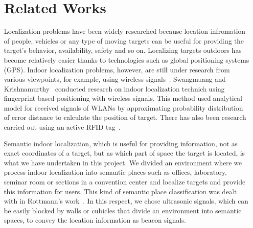 \section{Related Works}
\label{sec:related-works}


Localization problems have been widely researched because location infromation of people, vehicles or any type of moving targets can be useful for providing the target's behavior, availability, safety and so on. Localizing targets outdoors has become relatively easier thanks to technologies such as global positioning systems (GPS). Indoor localization problems, however, are still under research from various viewpoints, for example, using wireless signals~\cite{liu2007}. Swangmuang and Krishnamurthy~\cite{Swangmuang2008} conducted research on indoor localization technich using fingerprint based positioning with wireless signals. This method used analytical model for received signals of WLANs by approximating probability distribution of error distance to calculate the position of target. There has also been research carried out using an active RFID tag~\cite{Jin2006}.

Semantic indoor localization, which is useful for providing information, not as exact coordinates of a target, but as which part of space the target is located, is what we have undertaken in this project. We divided an environment where we process indoor localization into semantic places such as offices, laboratory, seminar room or sections in a convention center and localize targets and provide this information for users. This kind of semantic place classification was dealt with in Rottmann's work~\cite{Rottmann2005}. In this respect, we chose ultrasonic signals, which can be easily blocked by walls or cubicles that divide an environment into semantic spaces, to convey the location information as beacon signals. 



